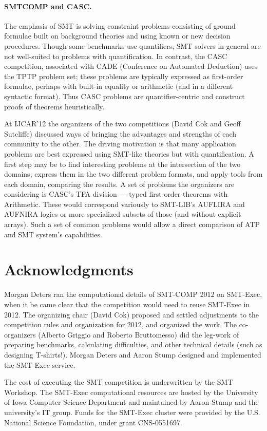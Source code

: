 \documentclass{llncs}
\begin{document}
\paragraph{SMTCOMP and CASC.}

The emphasis of SMT is solving constraint problems consisting of ground formulae built on background theories and using known or new decision procedures. Though some benchmarks use quantifiers, SMT solvers in general are not well-suited to problems with quantification. In contrast, the CASC competition, associated with CADE (Conference on Automated Deduction) uses the TPTP problem set; these problems are typically expressed as first-order formulae, perhaps with built-in equality or arithmetic (and in a different syntactic format). Thus CASC problems are quantifier-centric and construct proofs of theorems heuristically.

At IJCAR'12 the organizers of the two competitions (David Cok and Geoff Sutcliffe) discussed ways of bringing the advantages and strengths of each community to the other. The driving motivation is that many application problems are best expressed using SMT-like theories but with quantification. A first step may be to find interesting problems at the 
intersection of the two domains, express them in the two different problem formats, and apply tools from each domain, comparing the results. A set of problems the organizers are considering is CASC's TFA division --- typed first-order theorems with Arithmetic. These would correspond variously to SMT-LIB's AUFLIRA and AUFNIRA logics or more specialized subsets of those (and without explicit arrays). Such a set of common problems would allow a direct comparison of ATP and SMT system's capabilities.
   


\section*{Acknowledgments} 

Morgan Deters ran the computational details of
 SMT-COMP 2012 on SMT-Exec, when it be came clear that the competition would need to reuse SMT-Exec in 2012. The organizing chair (David Cok) proposed and settled adjustments to the competition rules and organization for 2012, and organized the work. The co-organizers 
(Alberto Griggio and Roberto Bruttomesso) did the leg-work of preparing benchmarks, calculating difficulties, and other technical details (such as designing T-shirts!). Morgan Deters and Aaron Stump designed and
implemented the SMT-Exec service.
 
The cost of executing the SMT competition is underwritten by the SMT Workshop. The SMT-Exec computational resources are hosted by the University of Iowa Computer Science Department and maintained by Aaron Stump and the university's IT group. Funds for the SMT-Exec cluster were provided by the U.S. National Science Foundation, under grant CNS-0551697.   



\end{document}
